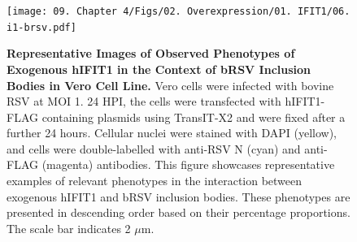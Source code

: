\begin{figure}
    \centering
    \texttt{[image: 09. Chapter 4/Figs/02. Overexpression/01. IFIT1/06. i1-brsv.pdf]}
    \caption[Representative Images of Observed Phenotypes of Exogenous hIFIT1 in the Context of bRSV Inclusion Bodies in Vero Cell Line.]{\textbf{Representative Images of Observed Phenotypes of Exogenous hIFIT1 in the Context of bRSV Inclusion Bodies in Vero Cell Line.} Vero cells were infected with bovine RSV at MOI 1. 24 HPI, the cells were transfected with hIFIT1-FLAG containing plasmids using TransIT-X2 and were fixed after a further 24 hours. Cellular nuclei were stained with DAPI (yellow), and cells were double-labelled with anti-RSV N (cyan) and anti-FLAG (magenta) antibodies. This figure showcases representative examples of relevant phenotypes in the interaction between exogenous hIFIT1 and bRSV inclusion bodies. These phenotypes are presented in descending order based on their percentage proportions. The scale bar indicates 2 \(\mu \mbox{m}\).}
    \label{fig:Representative Images of Observed Phenotypes of Exogenous hIFIT1 in the Context of bRSV Inclusion Bodies in VERO Cell Line}
\end{figure}

